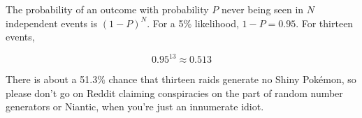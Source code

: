 \begin{tcolorbox}[enhanced,title=An aside regarding independent events,halign title=flush center]
The probability of an outcome with probability $P$ never being seen in $N$ independent
  events is ${(1 - P)}^N$. For a 5\% likelihood, $1 - P = 0.95$. For thirteen events,

  \[ 0.95^{13} ≈ 0.513 \]

There is about a 51.3\% chance that thirteen raids generate no Shiny Pokémon,
  so please don't go on Reddit claiming conspiracies on the part of
  random number generators or Niantic, when you're just an innumerate idiot.
\end{tcolorbox}
\pagecolor{black}
